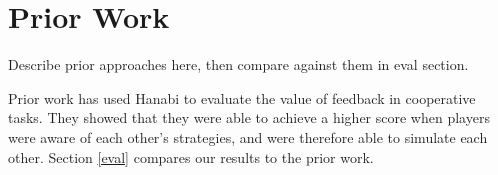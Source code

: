 \section{Prior Work}
\label{prior}

Describe prior approaches here, then compare against them in eval section.

Prior work \cite{solvinghanabi} has used Hanabi to evaluate the value of
feedback in cooperative tasks. They showed that they were able to achieve
a higher score when players were aware of each other’s strategies, and were
therefore able to simulate each other. Section \ref{eval} compares our results
to the prior work.
